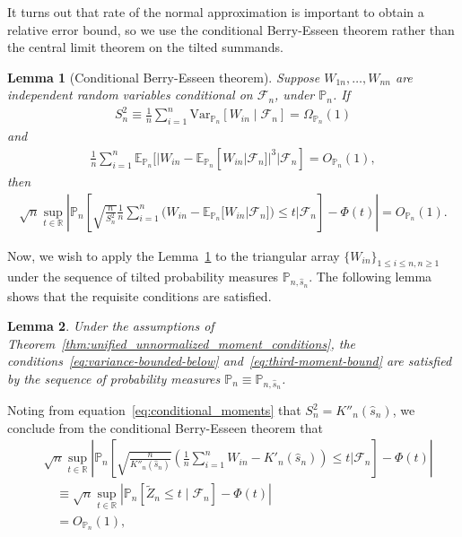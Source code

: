 \documentclass[12pt]{article}
\newtheorem{lemma}{Lemma}
\theoremstyle{definition}
\def\P{\mathbb{P}}
\def\P{\mathbb{P}}
\newcommand{\E}{\mathbb E}								%
\newcommand{\V}{\mathrm{Var}}							%
\renewcommand{\P}{\mathbb{P}}							%
\begin{document}
It turns out that rate of the normal approximation is important to obtain a relative error bound, so we use the conditional Berry-Esseen theorem rather than the central limit theorem on the tilted summands.
\begin{lemma}[Conditional Berry-Esseen theorem]\label{lem:conditional-berry-esseen}
	Suppose $W_{1n},\ldots,W_{nn}$ are independent random variables conditional on $\mathcal{F}_n$, under $\P_n$. If
	\begin{align}
	S_n^2 \equiv \frac{1}{n}\sum_{i=1}^n \V_{\P_n}[W_{in} \mid \mathcal{F}_n] = \Omega_{\P_n}(1) \label{eq:variance-bounded-below}
	\end{align}
	and
	\begin{align}
	\frac{1}{n}\sum_{i=1}^n \E_{\P_n}[|W_{in}-\E_{\P_n}[W_{in}|\mathcal{F}_n]|^3|\mathcal{F}_n]=O_{\P_n}(1), \label{eq:third-moment-bound}
	\end{align}
	then
	\begin{align*}
		\sqrt{n}\sup_{t\in\mathbb{R}}\left|\P_n\left[\sqrt{\frac{n}{S_n^2}}\frac1n\sum_{i=1}^n (W_{in}-\E_{\P_n}[W_{in}|\mathcal{F}_n])\leq t|\mathcal{F}_n\right]-\Phi(t)\right|=O_{\P_n}(1).
	\end{align*}
\end{lemma}
Now, we wish to apply the Lemma~\ref{lem:conditional-berry-esseen} to the triangular array $\{W_{in}\}_{1 \leq i \leq n, n \geq 1}$ under the sequence of tilted probability measures $\P_{n, \hat s_n}$. The following lemma shows that the requisite conditions are satisfied.
\begin{lemma} \label{lem:conditional_clt_assumptions}
	Under the assumptions of Theorem~\ref{thm:unified_unnormalized_moment_conditions}, the conditions~\eqref{eq:variance-bounded-below} and~\eqref{eq:third-moment-bound} are satisfied by the sequence of probability measures $\P_n \equiv \P_{n, \hat s_n}$.
\end{lemma}
\noindent Noting from equation~\eqref{eq:conditional_moments} that $S_n^2 = K''_n(\hat s_n)$, we conclude from the conditional Berry-Esseen theorem that
\begin{equation}
\begin{split}
&\sqrt{n}\sup_{t\in\mathbb{R}}\left|\P_n\left[\sqrt{\frac{n}{K''_n(\hat s_n)}}\left(\frac1n\sum_{i=1}^n W_{in}-K'_n(\hat s_n)\right)\leq t|\mathcal{F}_n\right]-\Phi(t)\right| \\
&\quad \equiv \sqrt{n}\sup_{t\in\mathbb{R}}\left|\P_n\left[\widetilde Z_n \leq t \mid \mathcal{F}_n\right]-\Phi(t)\right| \\
&\quad= O_{\P_n}(1),
\end{split}
\end{equation}
\end{document}
